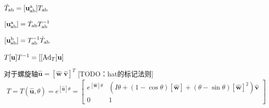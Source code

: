 \documentclass[12pt, a4paper, article, UTF8]{ctexart}
\begin{document}
\begin{mytheorem}
$\dot{T}_\textnormal{ab} = [\mathbf{u}_\textnormal{ab}^\textnormal{a}]T_\textnormal{ab}$ 
\end{mytheorem}

\begin{mytheorem}
$[\mathbf{u}_\textnormal{ab}^\textnormal{a}] = \dot{T}_\textnormal{ab}T_\textnormal{ab}^{-1}$ 
\end{mytheorem}

\begin{mytheorem}
$[\mathbf{u}_\textnormal{ab}^\textnormal{b}] = T_\textnormal{ab}^{-1} \dot{T}_\textnormal{ab}$ 
\end{mytheorem}

\begin{mytheorem}
$T[\mathbf{u}]T^{-1} = [[\textnormal{Ad}_{T}]\mathbf{u}]$ 
\end{mytheorem}

\begin{mytheorem}
对于螺旋轴$\hat{\mathbf{u}} = [\hat{\mathbf{w}} \; \hat{\mathbf{v}}]^T$ [TODO：hat的标记法则]
\begin{align*}
T=T(\hat{\mathbf{u}}, \theta)=e^{[\hat{\mathbf{u}}]\theta} = \begin{bmatrix}
e^{[\hat{\mathbf{w}}]\theta} & (I\theta+(1-\cos\theta)[\hat{\mathbf{w}}]+(\theta-\sin\theta)[\hat{\mathbf{w}}]^2)\hat{\mathbf{v}}\\
0 & 1
\end{bmatrix} 
\end{align*}
\end{mytheorem}
\end{document}
